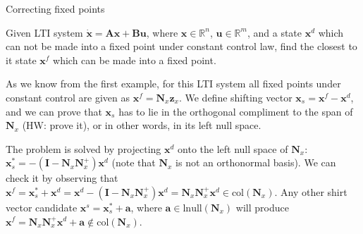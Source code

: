 \documentclass{beamer}
\begin{document}
\begin{frame}{Correcting fixed points}
\begin{flushleft}

Given LTI system $\dot{\mathbf{x}} = \mathbf{A} \mathbf{x} + \mathbf{B} \mathbf{u}$, where $\mathbf{x} \in \mathbb{R}^n$, $\mathbf{u} \in \mathbb{R}^m$, and a state $\mathbf{x}^d$ which can not be made into a fixed point under constant control law, find the closest to it state $\mathbf{x}^f$ which can be made into a fixed point.

\bigskip

As we know from the first example, for this LTI system all fixed points under constant control are given as $\mathbf{x}^f = \mathbf{N}_x \mathbf{z}_x$. We define shifting vector $\mathbf{x}_s = \mathbf{x}^f - \mathbf{x}^d$, and we can prove that $\mathbf{x}_s$ has to lie in the orthogonal compliment to the span of $\mathbf{N}_x$ (HW: prove it), or in other words, in its left null space.

\bigskip

The problem is solved by projecting $\mathbf{x}^d$ onto the left null space of $\mathbf{N}_x$: $\mathbf{x}^*_s = -(\mathbf{I} - \mathbf{N}_x\mathbf{N}^+_x)\mathbf{x}^d$ (note that $\mathbf{N}_x$ is not an orthonormal basis). We can check it by observing that $\mathbf{x}^f = \mathbf{x}^*_s + \mathbf{x}^d = \mathbf{x}^d - (\mathbf{I} - \mathbf{N}_x\mathbf{N}^+_x)\mathbf{x}^d = \mathbf{N}_x\mathbf{N}^+_x \mathbf{x}^d \in \text{col}(\mathbf{N}_x)$. Any other shirt vector candidate $\mathbf{x}^s = \mathbf{x}^*_s + \mathbf{a}$, where $\mathbf{a} \in \text{lnull}(\mathbf{N}_x)$ will produce $\mathbf{x}^f =  \mathbf{N}_x\mathbf{N}^+_x \mathbf{x}^d + \mathbf{a} \notin \text{col}(\mathbf{N}_x)$.

\end{flushleft}
\end{frame}
\end{document}
